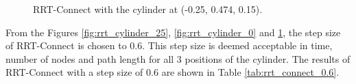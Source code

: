 \documentclass[../main.tex]{subfiles}
\begin{document}
\begin{figure}[H]
    \centering
    \noindent{}
    \caption{RRT-Connect with the cylinder at (-0.25, 0.474, 0.15).}
    \label{fig:rrt_cylinder_-25}
\end{figure}
From the Figures \ref{fig:rrt_cylinder_25}, \ref{fig:rrt_cylinder_0} and \ref{fig:rrt_cylinder_-25}, the step size of RRT-Connect is chosen to $0.6$. This step size is deemed acceptable in time, number of nodes and path length for all 3 positions of the cylinder. The results of RRT-Connect with a step size of $0.6$ are shown in Table \ref{tab:rrt_connect_0.6}.
\begin{table}[H]
\centering
{}
\caption{The results of the RRT-Connect with a step size of $0.6$}
\label{tab:rrt_connect_0.6}
\end{table}
\end{document}
